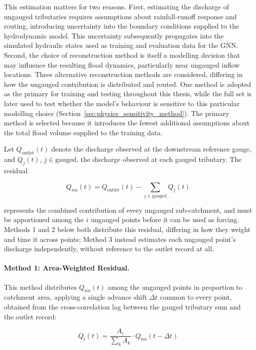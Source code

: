 \documentclass[12pt,a4paper]{report}
\begin{document}
This estimation matters for two reasons. First, estimating the discharge of ungauged tributaries requires assumptions about rainfall-runoff response and routing, introducing uncertainty into the boundary conditions supplied to the hydrodynamic model. This uncertainty subsequently propagates into the simulated hydraulic states used as training and evaluation data for the GNN. Second, the choice of reconstruction method is itself a modelling decision that may influence the resulting flood dynamics, particularly near ungauged inflow locations. Three alternative reconstruction methods are considered, differing in how the ungauged contribution is distributed and routed. One method is adopted as the primary for training and testing throughout this thesis, while the full set is later used to test whether the model's behaviour is sensitive to this particular modelling choice (Section~\ref{sec:physics_sensitivity_method}).
The primary method is selected because it introduces the fewest additional assumptions about the total flood volume supplied to the training data.

Let $Q_\text{outlet}(t)$ denote the discharge observed at the downstream reference
gauge, and $Q_j(t)$, $j \in \text{gauged}$, the discharge observed at each gauged
tributary. The residual

\begin{equation}
    Q_\text{res}(t) = Q_\text{outlet}(t) - \sum_{j \in \text{gauged}} Q_j(t)
    \label{eq:residual}
\end{equation}

represents the combined contribution of every ungauged sub-catchment, and must be
apportioned among the $i$ ungauged points before it can be used as forcing. Methods 1
and 2 below both distribute this residual, differing in how they weight and time it
across points; Method 3 instead estimates each ungauged point's discharge
independently, without reference to the outlet record at all.

\paragraph{Method 1: Area-Weighted Residual.}
This method distributes $Q_\text{res}(t)$ among the ungauged points in proportion to
catchment area, applying a single advance shift $\Delta t$ common to every point,
obtained from the cross-correlation lag between the gauged tributary sum and the
outlet record:

\begin{equation}
    Q_i(t) = \frac{A_i}{\sum_k A_k} \cdot Q_\text{res}(t - \Delta t)
    \label{eq:method1}
\end{equation}
\end{document}
